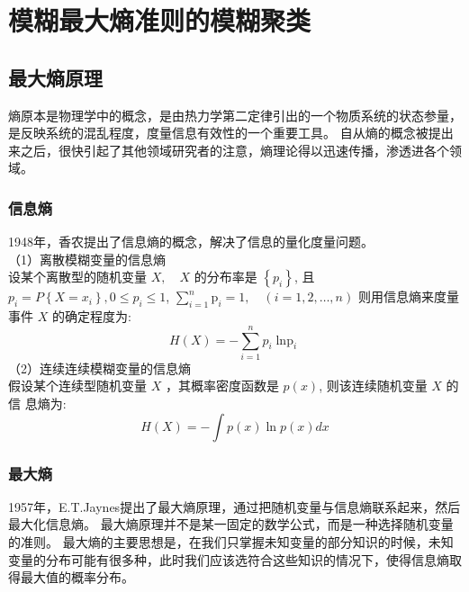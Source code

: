 \chapter[模糊最大熵准则的模糊聚类模型]{模糊最大熵准则的模糊聚类}

\section{最大熵原理}
熵原本是物理学中的概念，是由热力学第二定律引出的一个物质系统的状态参量，是反映系统的混乱程度，度量信息有效性的一个重要工具。
自从熵的概念被提出来之后，很快引起了其他领域研究者的注意，熵理论得以迅速传播，渗透进各个领域。
\subsection{信息熵}
1948年，香农\cite{1948A}提出了信息熵的概念，解决了信息的量化度量问题。\\
（1）离散模糊变量的信息熵\\
设某个离散型的随机变量 $X, \quad X$ 的分布率是 $\left\{p_{i}\right\}$, 且 $p_{i}=P\left\{X=x_{i}\right\}, 0 \leq p_{i} \leq 1$,
$\sum_{i=1}^n \mathrm{p}_i=1, \quad(i=1,2 ,\dots, n)$ 则用信息熵来度量事件 $X$ 的确定程度为:
\begin{equation}
    H(X) =-\sum_{i=1}^{n} p_{i} \operatorname{\ln p}_{i}
\end{equation}
（2）连续连续模糊变量的信息熵\\
假设某个连续型随机变量 $X$ ，其概率密度函数是 $p(x)$, 则该连续随机变量 $X$ 的信
息熵为:
\begin{equation}
    H(X)=-\int p(x) \ln p(x) d x
\end{equation}

\subsection{最大熵}
1957年，E.T.Jaynes提出了最大熵原理，通过把随机变量与信息熵联系起来，然后最大化信息熵。
最大熵原理并不是某一固定的数学公式，而是一种选择随机变量的准则。
最大熵的主要思想是，在我们只掌握未知变量的部分知识的时候，未知变量的分布可能有很多种，此时我们应该选符合这些知识的情况下，使得信息熵取得最大值的概率分布。

